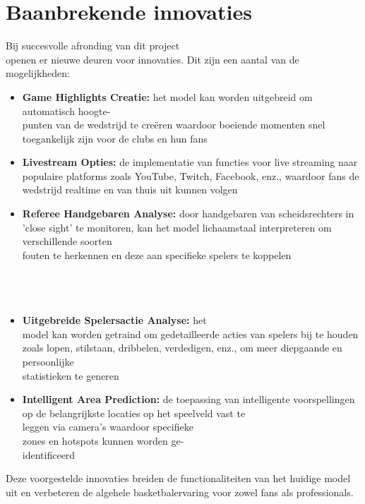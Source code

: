 \section{Baanbrekende innovaties}
\label{sec:vooruitstrevende_veranderingen}
Bij succesvolle afronding van dit project \\openen er nieuwe deuren voor innovaties. Dit zijn een aantal van de mogelijkheden:
\begin{itemize}
    \item \textbf{Game Highlights Creatie:} het model kan worden uitgebreid om automatisch hoogte-\\punten van de wedstrijd te creëren waardoor boeiende momenten snel toegankelijk zijn voor de clubs en hun fans
    \item \textbf{Livestream Opties:} de implementatie van functies voor live streaming naar populaire platforms zoals YouTube, Twitch, Facebook, enz., waardoor fans de wedstrijd realtime en van thuis uit kunnen volgen
    \item \textbf{Referee Handgebaren Analyse:} door handgebaren van scheidsrechters in 'close sight' te monitoren, kan het model lichaamstaal interpreteren om verschillende soorten \\fouten te herkennen en deze aan specifieke spelers te koppelen\\\\\\\\
    \item \textbf{Uitgebreide Spelersactie Analyse:} het \\model kan worden getraind om gedetailleerde acties van spelers bij te houden zoals lopen, stilstaan, dribbelen, verdedigen, enz., om meer diepgaande en persoonlijke \\statistieken te generen
    \item \textbf{Intelligent Area Prediction:} de toepassing van intelligente voorspellingen op de belangrijkste locaties op het speelveld vast te \\leggen via camera's waardoor specifieke \\zones en hotspots kunnen worden ge-\\identificeerd
\end{itemize}
Deze voorgestelde innovaties breiden de functionaliteiten van het huidige model uit en verbeteren de algehele basketbalervaring voor zowel fans als professionals.\\




